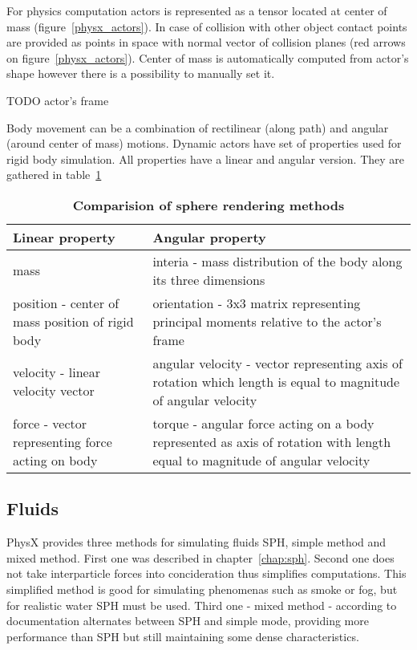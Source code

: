 For physics computation actors is represented as a tensor located at center of mass (figure~\ref{physx_actors}). In case of collision with other object contact points are provided as points in space with normal vector of collision planes (red arrows on figure~\ref{physx_actors}). Center of mass is automatically computed from actor's shape however there is a possibility to manually set it.

TODO actor's frame

Body movement can be a combination of rectilinear (along path) and angular (around center of mass) motions. Dynamic actors have set of properties used for rigid body simulation. All properties have a linear and angular version. They are gathered in table~\ref{tab:rigid_body_properties}

\begin{table}[htdp]
\caption[Rigid body parameters]{\textbf{Comparision of sphere rendering methods}}
\centering
    \begin{tabular}{|l|l|}
        \hline
        {\bf Linear property } & {\bf Angular property } \\ \hline
        mass           & interia - mass distribution of the body along its three dimensions         \\ 
        position - center of mass position of rigid body       & orientation - 3x3 matrix representing  principal moments relative to the actor's frame     \\ 
        velocity - linear velocity vector      & angular velocity - vector representing axis of rotation which length is equal to magnitude of angular velocity \\ 
        force - vector representing force acting on body     & torque - angular force acting on a body represented as axis of rotation with length equal to magnitude of angular velocity          \\
        \hline
    \end{tabular}
\label{tab:rigid_body_properties}
\end{table}

\subsection{Fluids}
PhysX provides three methods for simulating fluids SPH, simple method and mixed method. First one was described in chapter~\ref{chap:sph}. Second one does not take interparticle forces into concideration thus simplifies computations. This simplified method is good for simulating phenomenas such as smoke or fog, but for realistic water SPH must be used. Third one - mixed method - according to documentation \cite{PhysXDoc} alternates between SPH and simple mode, providing more performance than SPH but still maintaining some dense characteristics.

